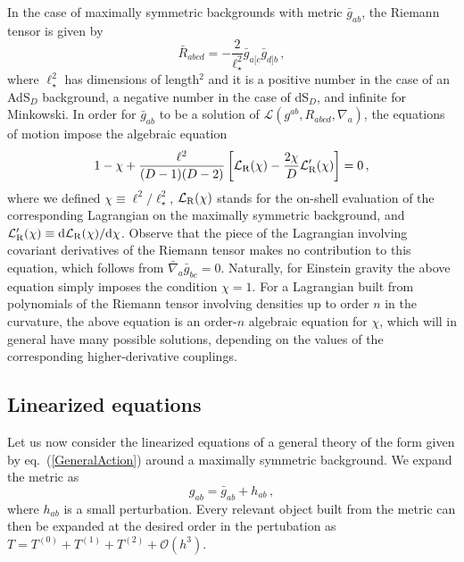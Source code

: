 \documentclass[11pt]{article}
\newcommand{\req}[1]{(\ref{#1})} %
\newcommand{\diff}{\mathrm{d}}
\renewcommand{\req}[1]{eq.~(\ref{#1})}
\newcommand{\comment}[1]{{\bf [[[#1]]]}}
\begin{document}
In the case of maximally symmetric backgrounds with metric $\bar g_{ab}$, the Riemann tensor is given by
\begin{equation}
\bar R_{abcd}= -\frac{2}{\ell_\star^2} \bar g_{a[c}\bar g_{d]b}\, ,
\end{equation}
where $\ell_\star^2$ has dimensions of length$^2$ and it is a positive number in the case of an AdS$_D$ background, a negative number in the case of dS$_D$, and infinite for Minkowski.  In order for $\bar g_{ab}$ to be a solution of $\mathcal{L}( g^{ab},R_{abcd},\nabla_a)$, the equations of motion impose the algebraic equation \cite{Aspects} %
\begin{equation}
1-\chi+\frac{\ell^2}{(D-1)(D-2)}\left[\mathcal{L}_{\rm R}(\chi)-\frac{2\chi}{D}\mathcal{L}_{\rm R}'(\chi)\right]=0\, ,
\end{equation}
 where we defined $\chi \equiv \ell^2/\ell_{\star}^2$,  $\mathcal{L}_{\rm R}(\chi)$ stands for the on-shell evaluation of the corresponding Lagrangian on the maximally symmetric background, and $\mathcal{L}_{\rm R}'(\chi)\equiv \diff \mathcal{L}_{\rm R}(\chi)/\diff \chi$. Observe that the piece of the Lagrangian involving covariant derivatives of the Riemann tensor makes no contribution to this equation, which follows from $\bar \nabla_a \bar g_{bc}=0$. Naturally, for Einstein gravity the above equation simply imposes the condition $\chi=1$. For a Lagrangian built from polynomials of the Riemann tensor  involving densities up to order $n$ in the curvature, the above equation is an order-$n$ algebraic equation for $\chi$, which will in general have many possible solutions, depending on the values of the corresponding higher-derivative couplings.


\subsection{Linearized equations}

 
Let us now consider the linearized equations of a general theory of the form given by \req{GeneralAction} around a maximally symmetric background. We expand the metric as
\begin{equation}
g_{ab}=\bar g_{ab}+  h_{ab}\, ,
\end{equation}
where $h_{ab}$ is a small perturbation. Every relevant object built from the metric can then be expanded at the desired order in the pertubation as $T=T^{(0)}+T^{(1)}+T^{(2)}+\mathcal{O}(h^3)$. %
\end{document}
